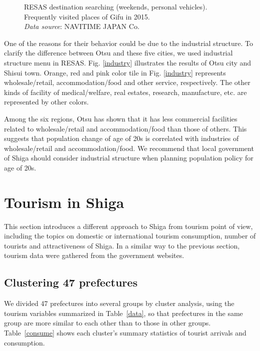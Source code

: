 \documentclass[10pt, conference, compsocconf]{IEEEtran}
\begin{document}
\begin{figure*}[!t]
\centering
\begin{center}
\caption{RESAS destination searching (weekends, personal vehicles). Frequently visited places of Gifu in 2015.
\\{\it Data source}: NAVITIME JAPAN Co.
}\label{gifu1}
\end{center}
\end{figure*}

One of the reasons for their behavior could be due to the industrial structure. 
To clarify the difference between Otsu and these five cities, we used industrial structure menu in RESAS.
Fig. \ref{industry} illustrates the results of Otsu city and Shisui town.
Orange, red and pink color tile in Fig. \ref{industry} represents wholesale/retail, accommodation/food and other service, respectively. The other kinds of facility of medical/welfare, real estates, research, manufacture, etc. are represented by other colors.

Among the six regions, Otsu has shown that it has less commercial facilities related to wholesale/retail and accommodation/food than those of others. This suggests that population change of age of 20s is correlated with industries of wholesale/retail and accommodation/food. We recommend that local government of Shiga should consider industrial structure when planning population policy for age of 20s.

\section{Tourism in Shiga}\label{sec:tour}
This section introduces a different approach to Shiga from tourism point of view, including the topics on domestic or international tourism consumption, number of tourists and attractiveness of Shiga. 
In a similar way to the previous section, tourism data were gathered from the government websites. 

\subsection{Clustering 47 prefectures}\label{clus}


We divided 47 prefectures into several groups by cluster analysis, using the tourism variables summarized in Table~\ref{data}, so that prefectures in the same group are more similar to each other than to those in other groups.
Table~\ref{consume} shows each cluster's summary statistics of tourist arrivals and consumption. 
\end{document}
